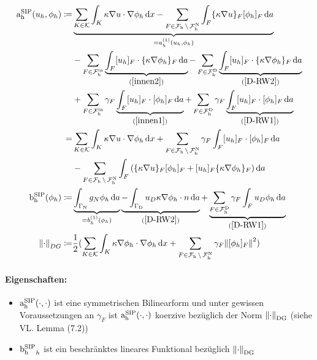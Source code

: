 \begin{define}
	\begin{align*}
		\asip(u_h, \phi_h) \coloneqq &\underbrace{\sum_{K \in \mathcal{K}} \int_K \kappa \nabla u \cdot \nabla \phi_h \diff x - \sum_{F \in \F\setminus\FN } \int_{F} \{\kappa \nabla u \}_F [\phi_h]_F \diff a}_{= a_h^{(1)}(u_h, \phi_h)}\\
		&- \sum_{F \in \FIn} \underbrace{\int_F [u_h]_F \cdot \{ \kappa \nabla \phi_h \}_F \diff a}_{(\ref{innen2})} - \sum_{F \in \FD} \underbrace{\int_F [u_h]_F \cdot \{ \kappa \nabla \phi_h \}_F \diff a}_{(\ref{D-RW2})}\\
		&+\sum_{F \in \FIn} \gamma_F \underbrace{\int_F [u_h]_F \cdot [\phi_h]_F \diff a}_{(\ref{innen1})} + \sum_{F \in \FD} \gamma_F \underbrace{\int_F [u_h]_F \cdot [\phi_h]_F \diff a}_{(\ref{D-RW1})}\\
		=& \sum_{K \in \mathcal{K}} \int_K \kappa \nabla u \cdot \nabla \phi_h \diff x + \sum_{F \in \F\setminus\FN}  \gamma_F \int_F [u_h]_F \cdot [\phi_h]_F \diff a\\
		&- \sum_{F \in \F\setminus\FN} \int_F \left(  \{\kappa \nabla u \}_F [\phi_h]_F + [u_h]_F \{\kappa \nabla \phi_h \}_F  \right) \diff a\\
		\bsip(\phi_h) \coloneqq & \underbrace{\int_{\GammaN} g_N \phi_h \diff a}_{=b_h^{(1)}(\phi_h)} \underbrace{ - \int_{\GammaD} u_D \kappa \nabla \phi_h \cdot n \diff a}_{(\ref{D-RW2})} + \underbrace{\sum_{F \in \FD} \gamma_F \int_F u_D \phi_h \diff a}_{(\ref{D-RW1})} \\
		\norm{\cdot}_{DG} \coloneqq  &\frac{1}{2} (\sum_{K \in \mathcal{K}} \int_{K} \kappa\nabla \phi_h \cdot \nabla \phi_h \diff x +  \sum_{F \in \F\setminus\FN }\gamma_F \norm{[ \phi_h ]_F}^2)
	\end{align*}
\end{define}

\paragraph{Eigenschaften:}
\begin{itemize}
	\item $ \operatorname{a_h^{\text{SIP}}}(\cdot,\cdot) $ ist eine symmetrischen Bilinearform und unter gewissen Voraussetzungen an $ \gamma_F $ ist $ \operatorname{a_h^{\text{SIP}}}(\cdot,\cdot) $ koerzive bezüglich der Norm $ \norm{\cdot}_{\text{DG}} $ (siehe VL. Lemma (7.2))
	\item $ \operatorname{b_h^{\text{SIP}}}_h $ ist ein beschränktes lineares Funktional bezüglich $ \norm{\cdot}_{\text{DG}} $ 
\end{itemize}

